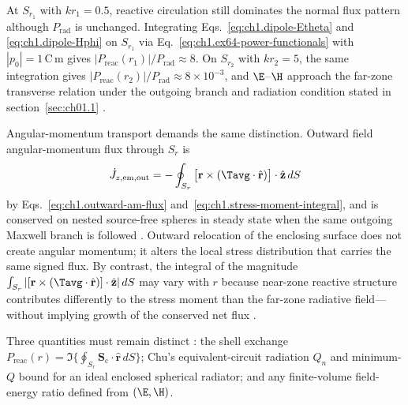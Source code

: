 At $S_{r_1}$ with $kr_1=0.5$, reactive circulation still dominates the normal flux pattern although $P_{\mathrm{rad}}$ is unchanged. Integrating Eqs.~\eqref{eq:ch1.dipole-Etheta} and \eqref{eq:ch1.dipole-Hphi} on $S_{r_1}$ via Eq.~\eqref{eq:ch1.ex64-power-functionals} with $|p_0|=1\,\mathrm{C\,m}$ gives $|P_{\mathrm{reac}}(r_1)|/P_{\mathrm{rad}}\approx 8$. On $S_{r_2}$ with $kr_2=5$, the same integration gives $|P_{\mathrm{reac}}(r_2)|/P_{\mathrm{rad}}\approx 8\times 10^{-3}$, and $\E$--$\H$ approach the far-zone transverse relation
under the outgoing branch and radiation condition stated in section~\ref{sec:ch01.1} \cite{stratton1941}.

Angular-momentum transport demands the same distinction. Outward field angular-momentum flux through $S_r$ is
\begin{equation}
\label{eq:ch1.ex64-am-flux-integral}
\dot J_{z,\mathrm{em,out}}
=-\oint_{S_r}\big[\mathbf{r}\times(\Tavg\cdot\hat{\mathbf{r}})\big]\cdot\hat{\mathbf{z}}\,dS
\end{equation}
by Eqs.~\eqref{eq:ch1.outward-am-flux} and~\eqref{eq:ch1.stress-moment-integral}, and is conserved on nested source-free spheres in steady state when the same outgoing Maxwell branch is followed \cite{stratton1941}. Outward relocation of the enclosing surface does not create angular momentum; it alters the local stress distribution that carries the same signed flux. By contrast, the integral of the magnitude $\int_{S_r}|[\mathbf{r}\times(\Tavg\cdot\hat{\mathbf{r}})]\cdot\hat{\mathbf{z}}|\,dS$ may vary with $r$ because near-zone reactive structure contributes differently to the stress moment than the far-zone radiative field---without implying growth of the conserved net flux \cite{stratton1941,beth1936}.

Three quantities must remain distinct \cite{chu1948,mcclean1996,stratton1941}: the shell exchange $P_{\mathrm{reac}}(r)=\Im\{\oint_{S_r}\mathbf{S}_\mathrm{c}\cdot\hat{\mathbf{r}}\,dS\}$; Chu's equivalent-circuit radiation $Q_n$ and minimum-$Q$ bound for an ideal enclosed spherical radiator; and any finite-volume field-energy ratio defined from $(\E,\H)$.

